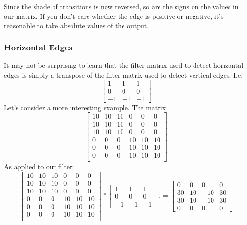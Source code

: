 \documentclass[12pt]{article}
\begin{document}
Since the shade of transitions is now reversed, so are the signs on the values
in our matrix. If you don't care whether the edge is positive or negative,
it's reasonable to take absolute values of the output.

\subsubsection{Horizontal Edges} It may not be surprising to learn that the filter
matrix used to detect horizontal edges is simply a transpose of the filter matrix
used to detect vertical edges. I.e.
\begin{equation*} \begin{bmatrix}   1 & 1 & 1 \\ 0 & 0 & 0 \\ -1 & -1 & -1 \end{bmatrix}   \end{equation*}
Let's consider a more interesting example. The matrix
\begin{equation}   \begin{bmatrix}     10 & 10 & 10 & 0 & 0 & 0 \\
    10 & 10 & 10 & 0 & 0 & 0 \\
    10 & 10 & 10 & 0 & 0 & 0 \\
    0 & 0 & 0 & 10 & 10 & 10 \\
    0 & 0 & 0 & 10 & 10 & 10 \\
    0 & 0 & 0 & 10 & 10 & 10 \\   \end{bmatrix} \end{equation}
As applied to our filter:
\begin{equation*}   \begin{bmatrix}     
    10 & 10 & 10 & 0 & 0 & 0 \\
    10 & 10 & 10 & 0 & 0 & 0 \\
    10 & 10 & 10 & 0 & 0 & 0 \\
    0 & 0 & 0 & 10 & 10 & 10 \\
    0 & 0 & 0 & 10 & 10 & 10 \\
    0 & 0 & 0 & 10 & 10 & 10 \\       \end{bmatrix}
  *
  \begin{bmatrix}   1 & 1 & 1 \\ 0 & 0 & 0 \\ -1 & -1 & -1 \end{bmatrix}.
  =
  \begin{bmatrix}     0 & 0 & 0 & 0 \\
    30 & 10 & -10 & 30 \\
    30 & 10 & -10 & 30 \\
    0 & 0 & 0 & 0   \end{bmatrix} \end{equation*}
\end{document}
